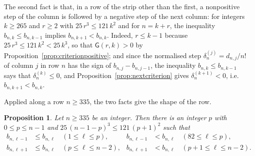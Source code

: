 \documentclass{amsart}
\newtheorem{proposition}[theorem]{Proposition}
\theoremstyle{definition}
\theoremstyle{remark}
\numberwithin{equation}{section}
\begin{document}
The second fact is that, in a row of the strip other than the first, a nonpositive step of the column is followed by a negative step of the next column: for integers $k\ge 265$ and $r\ge 2$ with $25\,r^3\le 121\,k^2$ and for $n=k+r$, the inequality $b_{n,k}\le b_{n,k-1}$ implies $b_{n,k+1}<b_{n,k}$. Indeed, $r\le k-1$ because $25\,r^3\le 121\,k^2<25\,k^3$, so that $\mathsf G(r,k)>0$ by Proposition~\ref{prop:criterionpositive}; and since the normalised step $\delta^{(j)}_n=d_{n,j}/n!$ of column $j$ in row $n$ has the sign of $b_{n,j}-b_{n,j-1}$, the inequality $b_{n,k}\le b_{n,k-1}$ says that $\delta^{(k)}_n\le 0$, and Proposition~\ref{prop:nextcriterion} gives $\delta^{(k+1)}_n<0$, i.e.\ $b_{n,k+1}<b_{n,k}$.

Applied along a row $n\ge 335$, the two facts give the shape of the row.

\begin{proposition}\label{prop:rowpeak}
Let $n\ge 335$ be an integer. Then there is an integer $p$ with $0\le p\le n-1$ and $25\,(n-1-p)^3\le 121\,(p+1)^2$ such that
\begin{align*}
b_{n,\ell-1}&\le b_{n,\ell}\quad(1\le\ell\le p), & b_{n,\ell-1}&<b_{n,\ell}\quad(82\le\ell\le p),\\
b_{n,\ell+1}&\le b_{n,\ell}\quad(p\le\ell\le n-2), & b_{n,\ell+1}&<b_{n,\ell}\quad(p+1\le\ell\le n-2).
\end{align*}
\end{proposition}
\end{document}
